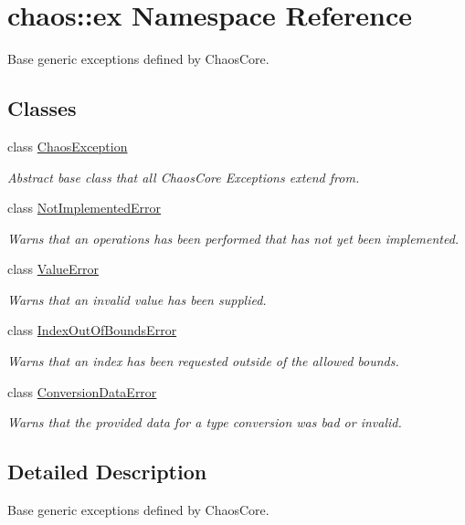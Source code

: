 \hypertarget{namespacechaos_1_1ex}{\section{chaos\-:\-:ex Namespace Reference}
\label{namespacechaos_1_1ex}
}


Base generic exceptions defined by Chaos\-Core.  


\subsection*{Classes}
\begin{DoxyCompactItemize}
\item 
class \hyperlink{classchaos_1_1ex_1_1_chaos_exception}{Chaos\-Exception}
\begin{DoxyCompactList}\small\item\em Abstract base class that all Chaos\-Core Exceptions extend from. \end{DoxyCompactList}\item 
class \hyperlink{classchaos_1_1ex_1_1_not_implemented_error}{Not\-Implemented\-Error}
\begin{DoxyCompactList}\small\item\em Warns that an operations has been performed that has not yet been implemented. \end{DoxyCompactList}\item 
class \hyperlink{classchaos_1_1ex_1_1_value_error}{Value\-Error}
\begin{DoxyCompactList}\small\item\em Warns that an invalid value has been supplied. \end{DoxyCompactList}\item 
class \hyperlink{classchaos_1_1ex_1_1_index_out_of_bounds_error}{Index\-Out\-Of\-Bounds\-Error}
\begin{DoxyCompactList}\small\item\em Warns that an index has been requested outside of the allowed bounds. \end{DoxyCompactList}\item 
class \hyperlink{classchaos_1_1ex_1_1_conversion_data_error}{Conversion\-Data\-Error}
\begin{DoxyCompactList}\small\item\em Warns that the provided data for a type conversion was bad or invalid. \end{DoxyCompactList}\end{DoxyCompactItemize}


\subsection{Detailed Description}
Base generic exceptions defined by Chaos\-Core. 